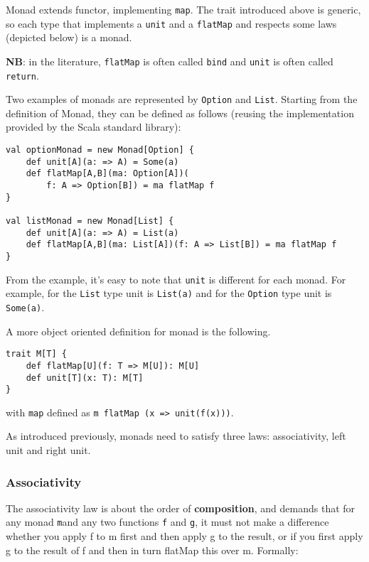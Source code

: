 Monad extends functor, implementing \texttt{map}. The trait introduced
above is generic, so each type that implements a \texttt{unit} and a
\texttt{flatMap} and respects some laws (depicted below) is a monad.

\textbf{NB}: in the literature, \texttt{flatMap} is often called
\texttt{bind} and \texttt{unit} is often called \texttt{return}.

Two examples of monads are represented by \texttt{Option} and
\texttt{List}. Starting from the definition of Monad, they can be
defined as follows (reusing the implementation provided by the Scala
standard library):

\begin{verbatim}
val optionMonad = new Monad[Option] {
    def unit[A](a: => A) = Some(a)
    def flatMap[A,B](ma: Option[A])(
    	f: A => Option[B]) = ma flatMap f
}

val listMonad = new Monad[List] {
    def unit[A](a: => A) = List(a)
    def flatMap[A,B](ma: List[A])(f: A => List[B]) = ma flatMap f
}
\end{verbatim}

From the example, it's easy to note that \texttt{unit} is different for
each monad. For example, for the \texttt{List} type unit is
\texttt{List(a)} and for the \texttt{Option} type unit is
\texttt{Some(a)}.

A more object oriented definition for monad is the following.

\begin{verbatim}
trait M[T] {
    def flatMap[U](f: T => M[U]): M[U]
    def unit[T](x: T): M[T]
}
\end{verbatim}

with \texttt{map} defined as
\texttt{m\ flatMap\ (x\ =\textgreater{}\ unit(f(x)))}.

As introduced previously, monads need to satisfy three laws:
associativity, left unit and right unit.

\subsubsection{Associativity}\label{associativity}

The associativity law is about the order of \textbf{composition}, and
demands that for any monad \texttt{m}and any two functions \texttt{f}
and \texttt{g}, it must not make a difference whether you apply f to m
first and then apply g to the result, or if you first apply g to the
result of f and then in turn flatMap this over m. Formally:

